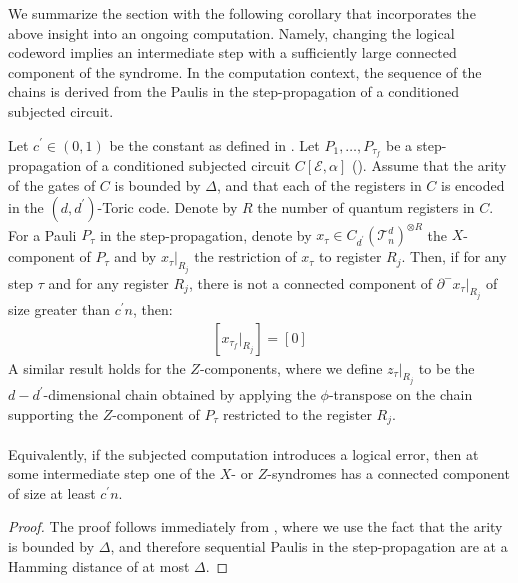 We summarize the section with the following corollary that incorporates the above insight into an ongoing computation. Namely, changing the logical codeword implies an intermediate step with a sufficiently large connected component of the syndrome. In the computation context, the sequence of the chains is derived from the Paulis in the step-propagation of a conditioned subjected circuit.
\begin{corollary}
  \label{coro:barrier}
  Let $c^{\prime} \in (0,1)$ be the constant as defined in . Let $P_{1},\ldots,P_{\tau_{f}}$ be a step-propagation of a conditioned subjected circuit $C[\mathcal{E},\alpha]$ (). Assume that the arity of the gates of $C$ is bounded by $\Delta$, and that each of the registers in $C$ is encoded in the $(d,d^{\prime})$-Toric code. Denote by $R$ the number of quantum registers in $C$. For a Pauli $P_{\tau}$ in the step-propagation, denote by $x_{\tau} \in C_{d^{\prime}}(\mathcal{T}_n^d)^{\otimes R}$ the $X$-component of $P_{\tau}$ and by $x_{\tau}|_{R_{j}}$ the restriction of $x_{\tau}$ to register $R_{j}$. Then, if for any step $\tau$ and for any register $R_{j}$, there is not a connected component of $\partial^{-} x_{\tau}|_{R_{j}}$ of size greater than $c^{\prime}n$, then:
  \begin{equation*}
    \begin{split}
      [x_{\tau_{f}} |_{R_{j}}] = [0] 
    \end{split}
  \end{equation*}
A similar result holds for the $Z$-components, where we define $z_{\tau}|_{R_{j}}$ to be the $d-d^{\prime}$-dimensional chain obtained by applying the $\phi$-transpose on the chain supporting the $Z$-component of $P_{\tau}$ restricted to the register $R_{j}$.
\paragraph{}
Equivalently, if the subjected computation introduces a logical error, then at some intermediate step one of the $X$- or $Z$-syndromes has a connected component of size at least $c^{\prime}n$. 
\end{corollary}
\begin{proof}
The proof follows immediately from , where we use the fact that the arity is bounded by $\Delta$, and therefore sequential Paulis in the step-propagation are at a Hamming distance of at most $\Delta$.
\end{proof}

